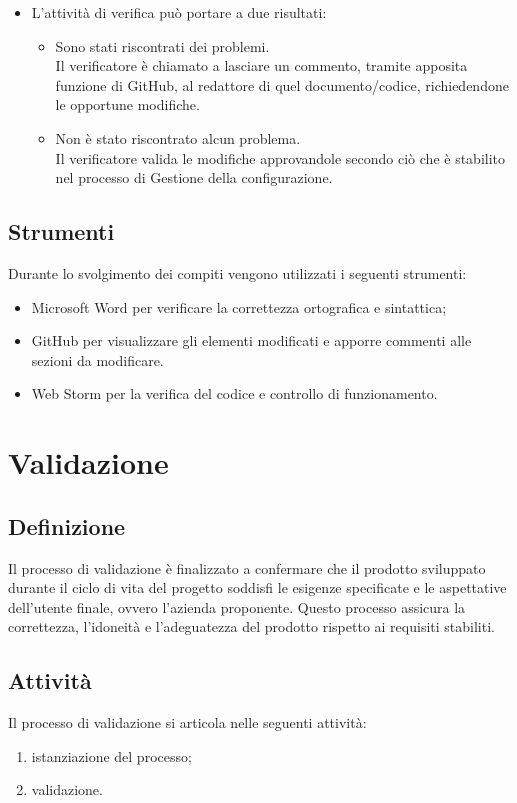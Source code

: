 \begin{itemize}
\begin{itemize}
    \end{itemize}
    \item L'attività di verifica può portare a due risultati:
    \begin{itemize}
        \item Sono stati riscontrati dei problemi.\\
        Il verificatore è chiamato a lasciare un commento, tramite apposita funzione di GitHub, al redattore di quel documento/codice, richiedendone le opportune modifiche.
        \item Non è stato riscontrato alcun problema.\\
        Il verificatore valida le modifiche approvandole secondo ciò che è stabilito nel processo di Gestione della configurazione.
    \end{itemize}
\end{itemize}

\subsection{Strumenti}
Durante lo svolgimento dei compiti vengono utilizzati i seguenti strumenti:
\begin{itemize}
    \item Microsoft Word per verificare la correttezza ortografica e sintattica;
    \item GitHub per visualizzare gli elementi modificati e apporre commenti alle sezioni da modificare.
    \item Web Storm per la verifica del codice e controllo di funzionamento.
\end{itemize}
\newpage

\section{Validazione} \label{sec:validazione}
\subsection{Definizione}
Il processo di validazione è finalizzato a confermare che il prodotto sviluppato durante il ciclo di vita del progetto soddisfi le esigenze specificate e le aspettative dell'utente finale, ovvero l'azienda proponente. Questo processo assicura la correttezza, l'idoneità e l'adeguatezza del prodotto rispetto ai requisiti stabiliti.
\subsection{Attività}
Il processo di validazione si articola nelle seguenti attività:
\begin{enumerate}
    \item istanziazione del processo;
    \item validazione.
\end{enumerate}
